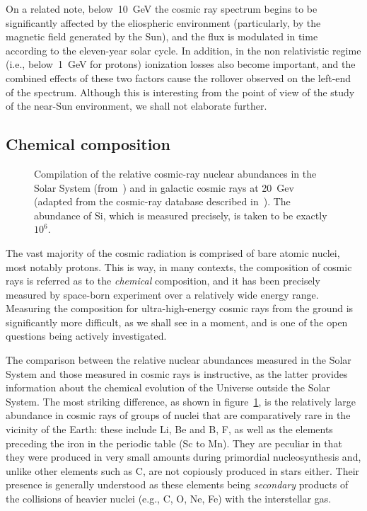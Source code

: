 On a related note, below~10~GeV the cosmic ray spectrum begins to be significantly
affected by the eliospheric environment (particularly, by the magnetic field generated
by the Sun), and the flux is modulated in time according to the eleven-year solar
cycle. In addition, in the non relativistic regime (i.e., below~1~GeV for protons)
ionization losses also become important, and the combined effects of these two
factors cause the rollover observed on the left-end of the spectrum. Although this
is interesting from the point of view of the study of the near-Sun environment,
we shall not elaborate further.


\subsection{Chemical composition}
\label{sec:cr_composition}

\begin{figure}[!htbp]
  
  \caption{Compilation of the relative cosmic-ray nuclear abundances in the Solar System
    (from~\cite{2003ApJ...591.1220L}) and in galactic cosmic rays at 20~Gev (adapted from
    the cosmic-ray database described in~\cite{2023EPJC...83..971}). The abundance
    of Si, which is measured precisely, is taken to be exactly $10^6$.}
  \label{fig:cr_composition}
\end{figure}

The vast majority of the cosmic radiation is comprised of bare atomic nuclei,
most notably protons. This is way, in many contexts, the composition of cosmic
rays is referred as to the \emph{chemical} composition, and it has been precisely
measured by space-born experiment over a relatively wide energy
range. Measuring the composition for ultra-high-energy cosmic rays from the ground
is significantly more difficult, as we shall see in a moment, and is one of the open
questions being actively investigated.

The comparison between the relative nuclear abundances measured in the Solar
System and
those measured in cosmic rays is instructive, as the latter provides information
about the chemical evolution of the Universe outside the Solar System.
The most striking difference, as shown in figure~\ref{fig:cr_composition}, is the
relatively large abundance in cosmic rays of groups of nuclei that are comparatively
rare in the vicinity of the Earth: these include Li, Be and B, F, as well as the
elements preceding the iron in the periodic table (Sc to Mn). They are peculiar in that
they were produced in very small amounts during primordial nucleosynthesis and, unlike
other elements such as C, are not copiously produced in stars either.
Their presence is generally understood as these elements being \emph{secondary} products
of the collisions of heavier nuclei (e.g., C, O, Ne, Fe) with the interstellar gas.

